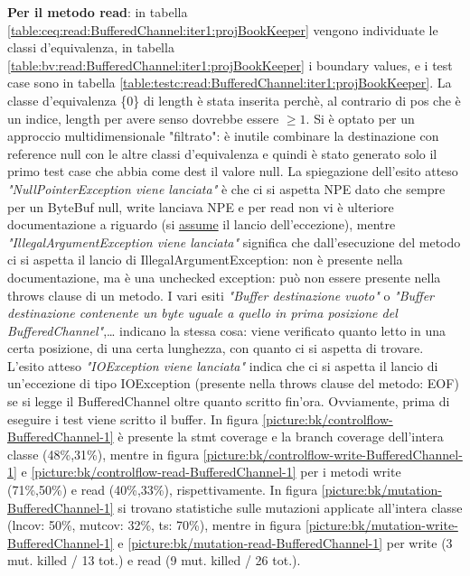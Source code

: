 \documentclass[10pt, a4paper]{article}
\newcommand{\gettablelabel}[5]{table:#1:#2:#3:iter#4:proj#5}
\newcommand{\getpicturelabel}[1]{picture:#1}
\def\bookkeeper{BookKeeper}
\newcommand{\ceq}[1]{\{#1\}}
\begin{document}
	\textbf{Per il metodo read}: in tabella \ref{\gettablelabel{ceq}{read}{BufferedChannel}{1}{\bookkeeper}}
	vengono individuate le classi d'equivalenza, in tabella 
	\ref{\gettablelabel{bv}{read}{BufferedChannel}{1}{\bookkeeper}} 
	i boundary values, e i test case sono in tabella 
	\ref{\gettablelabel{testc}{read}{BufferedChannel}{1}{\bookkeeper}}.
	La classe d'equivalenza \ceq{0} di length è stata inserita perchè, al contrario di pos che è un indice, 
	length per avere senso dovrebbe essere $\ge 1$.
	Si è optato per un approccio multidimensionale "filtrato": è inutile combinare la destinazione con reference
	null con le altre classi d'equivalenza e quindi è stato generato solo il primo test case che abbia come
	dest il valore null.
	La spiegazione dell'esito atteso \textit{"NullPointerException viene lanciata"} è che ci si aspetta NPE dato
	che sempre per un ByteBuf null, write lanciava NPE e per read non vi è ulteriore documentazione a riguardo 
	(si \underline{assume} il lancio dell'eccezione),
	mentre \textit{"IllegalArgumentException viene lanciata"} significa che dall'esecuzione
	del metodo ci si aspetta il lancio di IllegalArgumentException: non è presente nella documentazione, ma è
	una unchecked exception: può non essere presente nella throws clause di un metodo.
	I vari esiti \textit{"Buffer destinazione vuoto"} o 
	\textit{"Buffer destinazione contenente un byte uguale a quello in prima posizione del BufferedChannel"},\dots
	indicano la stessa cosa: 
	viene verificato quanto letto in una certa posizione, di una certa lunghezza, 
	con quanto ci si aspetta di trovare. 
	L'esito atteso \textit{"IOException viene lanciata"} indica che ci si aspetta il lancio di un'eccezione di tipo 
	IOException (presente nella throws clause del metodo: EOF) 
	se si legge il BufferedChannel oltre quanto scritto fin'ora. 
	Ovviamente, prima di eseguire i test viene scritto il buffer.
	In figura \ref{\getpicturelabel{bk/controlflow-BufferedChannel-1}} è presente la stmt coverage e la branch
	coverage dell'intera classe (48\%,31\%), 
	mentre in figura \ref{\getpicturelabel{bk/controlflow-write-BufferedChannel-1}} e 
	\ref{\getpicturelabel{bk/controlflow-read-BufferedChannel-1}} per i metodi 
	write (71\%,50\%) e read (40\%,33\%), rispettivamente.
	In figura \ref{\getpicturelabel{bk/mutation-BufferedChannel-1}} si trovano statistiche sulle mutazioni
	applicate all'intera classe (lncov: 50\%, mutcov: 32\%, ts: 70\%), mentre in figura \ref{\getpicturelabel{bk/mutation-write-BufferedChannel-1}} e 
	\ref{\getpicturelabel{bk/mutation-read-BufferedChannel-1}} per write (3 mut. killed / 13 tot.) e read (9 mut. killed / 26 tot.).
\end{document}
